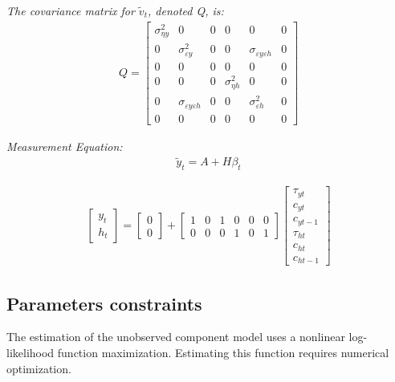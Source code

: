 \documentclass[12pt]{article}
\begin{document}
\begin{outline}[enumerate]
		\bigskip
		\textit{The covariance matrix for $\tilde{v}_t$, denoted Q, is: }
		\begin{align}
		Q = 
		\begin{bmatrix}
		\sigma^2_{\eta y}	& 0	 &0 & 0	& 0	& 0	\\
		0	& \sigma^2_{\varepsilon y}	& 0	& 0	& \sigma_{\varepsilon y \varepsilon h}	& 0	\\
		0	&	0	& 0 & 0 & 0 & 0	\\
		0	& 0	& 0	& \sigma^2_{\eta h}	& 0	& 0	\\
		0	& \sigma_{\varepsilon y \varepsilon h}	& 0	& 0	& \sigma^2_{\varepsilon h}		& 0	\\
		0	&0	& 0	& 0
		& 0	& 0
		\end{bmatrix}
		\end{align}
		
		\bigskip
		\textit{Measurement Equation:}
		\begin{align}
		\tilde{y}_t = A + H\beta_t
		\end{align}
		
		\begin{align*}
		\begin{bmatrix}
		y_t	\\
		h_t
		\end{bmatrix}
		=
		\begin{bmatrix}
		0	\\
		0
		\end{bmatrix}
		+
		\begin{bmatrix}
		1	& 0	& 1	& 0	& 0 & 0 \\
		0	& 0 & 0 & 1 & 0 & 1
		\end{bmatrix}
		\begin{bmatrix}
		\tau_{yt}	\\
		c_{yt}		\\
		c_{yt-1}	\\
		\tau_{ht}	\\
		c_{ht}		\\
		c_{ht-1}
		\end{bmatrix}
		\end{align*}
		
\subsection{Parameters constraints}

The estimation of the unobserved component model uses a nonlinear log-likelihood function maximization. Estimating this function requires numerical optimization.



\end{outline}
\end{document}
